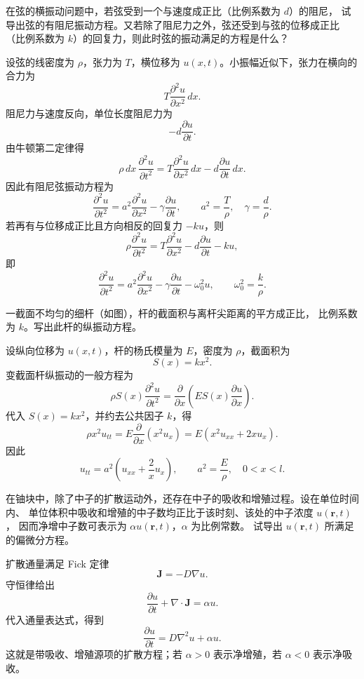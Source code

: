 ﻿


\begin{question}
在弦的横振动问题中，若弦受到一个与速度成正比（比例系数为 \(d\)）的阻尼，
试导出弦的有阻尼振动方程。又若除了阻尼力之外，弦还受到与弦的位移成正比
（比例系数为 \(k\)）的回复力，则此时弦的振动满足的方程是什么？
\begin{solution}
设弦的线密度为 \(\rho\)，张力为 \(T\)，横位移为 \(u(x,t)\)。小振幅近似下，张力在横向的合力为
\[
T\frac{\partial^2u}{\partial x^2}\,dx.
\]
阻尼力与速度反向，单位长度阻尼力为
\[
-d\frac{\partial u}{\partial t}.
\]
由牛顿第二定律得
\[
\rho\,dx\,\frac{\partial^2u}{\partial t^2}
=T\frac{\partial^2u}{\partial x^2}\,dx
-d\frac{\partial u}{\partial t}\,dx.
\]
因此有阻尼弦振动方程为
\[
\frac{\partial^2u}{\partial t^2}
=a^2\frac{\partial^2u}{\partial x^2}
-\gamma\frac{\partial u}{\partial t},
\qquad
a^2=\frac{T}{\rho},\quad \gamma=\frac{d}{\rho}.
\]
若再有与位移成正比且方向相反的回复力 \(-ku\)，则
\[
\rho\frac{\partial^2u}{\partial t^2}
=T\frac{\partial^2u}{\partial x^2}
-d\frac{\partial u}{\partial t}-ku,
\]
即
\[
\frac{\partial^2u}{\partial t^2}
=a^2\frac{\partial^2u}{\partial x^2}
-\gamma\frac{\partial u}{\partial t}
-\omega_0^2u,
\qquad
\omega_0^2=\frac{k}{\rho}.
\]
\end{solution}
\end{question}

\begin{question}
一截面不均匀的细杆（如图），杆的截面积与离杆尖距离的平方成正比，
比例系数为 \(k\)。写出此杆的纵振动方程。

\begin{solution}
设纵向位移为 \(u(x,t)\)，杆的杨氏模量为 \(E\)，密度为 \(\rho\)，截面积为
\[
S(x)=kx^2.
\]
变截面杆纵振动的一般方程为
\[
\rho S(x)\frac{\partial^2u}{\partial t^2}
=\frac{\partial}{\partial x}
\left(E S(x)\frac{\partial u}{\partial x}\right).
\]
代入 \(S(x)=kx^2\)，并约去公共因子 \(k\)，得
\[
\rho x^2u_{tt}=E\frac{\partial}{\partial x}(x^2u_x)
=E(x^2u_{xx}+2xu_x).
\]
因此
\[
u_{tt}=a^2\left(u_{xx}+\frac{2}{x}u_x\right),
\qquad
a^2=\frac{E}{\rho},\quad 0<x<l.
\]
\end{solution}
\end{question}

\begin{question}
在铀块中，除了中子的扩散运动外，还存在中子的吸收和增殖过程。设在单位时间内、
单位体积中吸收和增殖的中子数均正比于该时刻、该处的中子浓度 \(u(\bm r,t)\)，
因而净增中子数可表示为 \(\alpha u(\bm r,t)\)，\(\alpha\) 为比例常数。
试导出 \(u(\bm r,t)\) 所满足的偏微分方程。
\begin{solution}
扩散通量满足 Fick 定律
\[
\bm J=-D\nabla u.
\]
守恒律给出
\[
\frac{\partial u}{\partial t}+\nabla\cdot\bm J=\alpha u.
\]
代入通量表达式，得到
\[
\frac{\partial u}{\partial t}
=D\nabla^2u+\alpha u.
\]
这就是带吸收、增殖源项的扩散方程；若 \(\alpha>0\) 表示净增殖，若 \(\alpha<0\) 表示净吸收。
\end{solution}
\end{question}

